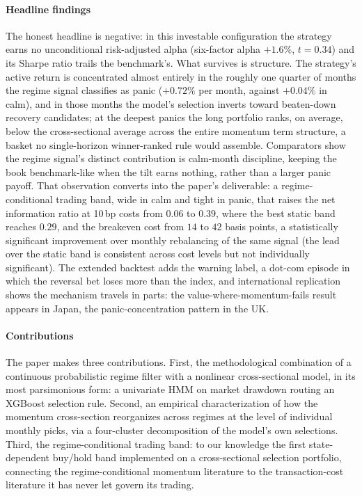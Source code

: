 \paragraph{Headline findings} The honest headline is negative: in this investable configuration the strategy earns no unconditional risk-adjusted alpha (six-factor alpha $+1.6\%$, $t = 0.34$) and its Sharpe ratio trails the benchmark's. What survives is structure. The strategy's active return is concentrated almost entirely in the roughly one quarter of months the regime signal classifies as panic ($+0.72\%$ per month, against $+0.04\%$ in calm), and in those months the model's selection inverts toward beaten-down recovery candidates; at the deepest panics the long portfolio ranks, on average, below the cross-sectional average across the entire momentum term structure, a basket no single-horizon winner-ranked rule would assemble. Comparators show the regime signal's distinct contribution is calm-month discipline, keeping the book benchmark-like when the tilt earns nothing, rather than a larger panic payoff. That observation converts into the paper's deliverable: a regime-conditional trading band, wide in calm and tight in panic, that raises the net information ratio at 10\,bp costs from $0.06$ to $0.39$, where the best static band reaches $0.29$, and the breakeven cost from $14$ to $42$ basis points, a statistically significant improvement over monthly rebalancing of the same signal (the lead over the static band is consistent across cost levels but not individually significant). The extended backtest adds the warning label, a dot-com episode in which the reversal bet loses more than the index, and international replication shows the mechanism travels in parts: the value-where-momentum-fails result appears in Japan, the panic-concentration pattern in the UK.

\paragraph{Contributions} The paper makes three contributions. First, the methodological combination of a continuous probabilistic regime filter with a nonlinear cross-sectional model, in its most parsimonious form: a univariate HMM on market drawdown routing an XGBoost selection rule. Second, an empirical characterization of how the momentum cross-section reorganizes across regimes at the level of individual monthly picks, via a four-cluster decomposition of the model's own selections. Third, the regime-conditional trading band: to our knowledge the first state-dependent buy/hold band implemented on a cross-sectional selection portfolio, connecting the regime-conditional momentum literature to the transaction-cost literature it has never let govern its trading.


